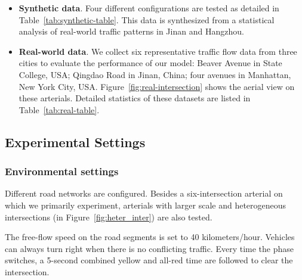 \begin{itemize}[wide,noitemsep,topsep=0pt]
\item {\bf Synthetic data}. Four different configurations are tested as detailed in Table~\ref{tab:synthetic-table}. This data is synthesized from a statistical analysis of real-world traffic patterns in Jinan and Hangzhou. 
\item {\bf Real-world data}. We collect six representative traffic flow data from three cities to evaluate the performance of our model: Beaver Avenue in State College, USA; Qingdao Road in Jinan, China; four avenues in Manhattan, New York City, USA. Figure~\ref{fig:real-intersection} shows the aerial view on these arterials. Detailed statistics of these datasets are listed in Table~\ref{tab:real-table}. 
\end{itemize}

\subsection{Experimental Settings}

\subsubsection{Environmental settings}
Different road networks are configured. Besides a six-intersection arterial on which we primarily experiment, arterials with larger scale and heterogeneous intersections (in Figure~\ref{fig:heter_inter}) are also tested. 

The free-flow speed on the road segments is set to 40 kilometers/hour. Vehicles can always turn right when there is no conflicting traffic. Every time the phase switches, a 5-second combined yellow and all-red time are followed to clear the intersection. 

